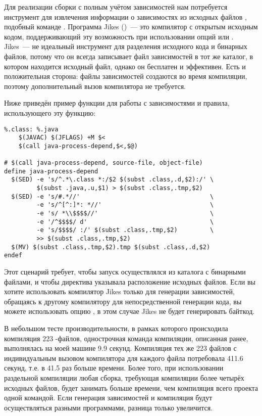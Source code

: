 Для реализации сборки с полным учётом зависимостей нам потребуется
инструмент для извлечения информации о зависимостях из исходных файлов
\Java{}, подобный команде . Программа Jikes
()~---
это компилятор \Java{} с открытым исходным кодом, поддерживающий
эту возможность при использовании опций  или
. Jikes~--- не идеальный инструмент для разделения
исходного кода и бинарных файлов, потому что он всегда записывает файл
зависимостей в тот же каталог, в котором находится исходный файл,
однако он бесплатен и эффективен. Есть и положительная сторона: файлы
зависимостей создаются во время компиляции, поэтому дополнительный
вызов компилятора не требуется.

Ниже приведён пример функции для работы с зависимостями и правила,
использующего эту функцию:

{\footnotesize
\begin{verbatim}
%.class: %.java
    $(JAVAC) $(JFLAGS) +M $<
    $(call java-process-depend,$<,$@)

# $(call java-process-depend, source-file, object-file)
define java-process-depend
  $(SED) -e 's/^.*\.class *:/$2 $(subst .class,.d,$2):/' \
         $(subst .java,.u,$1) > $(subst .class,.tmp,$2)
  $(SED) -e 's/#.*//'                                    \
         -e 's/^[^:]*: *//'                              \
         -e 's/ *\\$$$$//'                               \
         -e '/^$$$$/ d'                                  \
         -e 's/$$$$/ :/' $(subst .class,.tmp,$2)         \
         >> $(subst .class,.tmp,$2)
  $(MV) $(subst .class,.tmp,$2).tmp $(subst .class,.d,$2)
endef
\end{verbatim}
}

Этот сценарий требует, чтобы запуск \GNUmake{} осуществлялся из
каталога с бинарными файлами, и чтобы директива 
указывала расположение исходных файлов. Если вы хотите использовать
компилятор Jikes только для генерации зависимостей, обращаясь к
другому компилятору для непосредственной генерации кода, вы можете
использовать опцию , в этом случае Jikes не будет
генерировать байт\-код.

В небольшом тесте производительности, в рамках которого происходила
компиляция 223 \Java{}\hyp{}файлов, однострочная команда компиляции,
описанная ранее, выполнялась на моей машине 9.9 секунд. Компиляция тех
же 223 файлов с индивидуальным вызовом компилятора для каждого файла
потребовала 411.6 секунд, т.е. в 41.5 раз больше времени. Более того,
при использовании раздельной компиляции любая сборка, требующая
компиляции более четырёх исходных файлов, будет занимать больше
времени, чем компиляция всего проекта одной командой. Если генерация
зависимостей и компиляция будут осуществляться разными программами,
разница только увеличится.

